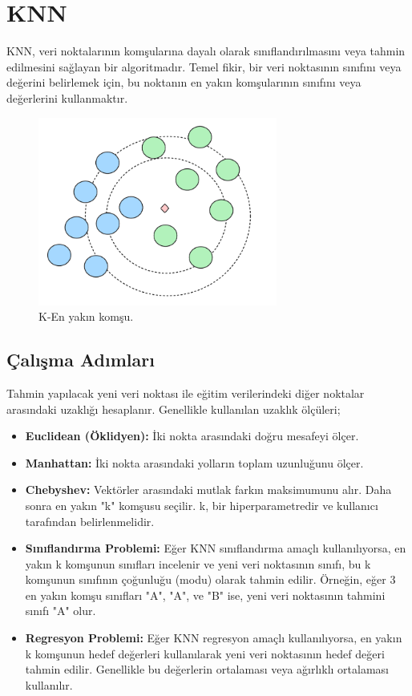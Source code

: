 \section{KNN}
KNN, veri noktalarının komşularına dayalı olarak sınıflandırılmasını veya tahmin edilmesini sağlayan bir algoritmadır. Temel fikir, bir veri noktasının sınıfını veya değerini belirlemek için, bu noktanın en yakın komşularının sınıfını veya değerlerini kullanmaktır.

\begin{figure}[h]
    \centering
    \includegraphics[width=0.7\textwidth]{images/knn.png}
    \caption{K-En yakın komşu.}
    \label{fig:enter-label}
\end{figure}

\subsection{Çalışma Adımları}
Tahmin yapılacak yeni veri noktası ile eğitim verilerindeki diğer noktalar arasındaki uzaklığı hesaplanır. Genellikle kullanılan uzaklık ölçüleri;
\begin{itemize}
    \item \textbf{Euclidean (Öklidyen):} İki nokta arasındaki doğru mesafeyi ölçer.
    \item \textbf{Manhattan:} İki nokta arasındaki yolların toplam uzunluğunu ölçer.
    \item \textbf{Chebyshev:} Vektörler arasındaki mutlak farkın maksimumunu alır. Daha sonra en yakın "k" komşusu seçilir. k, bir hiperparametredir ve kullanıcı tarafından belirlenmelidir.
    \item \textbf{Sınıflandırma Problemi:} Eğer KNN sınıflandırma amaçlı kullanılıyorsa, en yakın k komşunun sınıfları incelenir ve yeni veri noktasının sınıfı, bu k komşunun sınıfının çoğunluğu (modu) olarak tahmin edilir. Örneğin, eğer 3 en yakın komşu sınıfları "A", "A", ve "B" ise, yeni veri noktasının tahmini sınıfı "A" olur.
    \item \textbf{Regresyon Problemi:} Eğer KNN regresyon amaçlı kullanılıyorsa, en yakın k komşunun hedef değerleri kullanılarak yeni veri noktasının hedef değeri tahmin edilir. Genellikle bu değerlerin ortalaması veya ağırlıklı ortalaması kullanılır.
\end{itemize}

